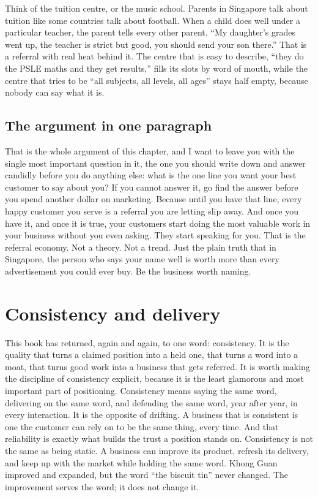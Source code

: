 \documentclass[10pt,twoside,openany]{memoir}
\newcommand{\needspacehead}{\needspace{4\baselineskip}}
\let\oldsection\section
\renewcommand{\section}{\needspacehead\oldsection}
\begin{document}
{Think of the tuition centre, or the music school. Parents in Singapore
talk about tuition like some countries talk about football. When a child
does well under a particular teacher, the parent tells every other
parent. ``My daughter's grades went up, the teacher is strict but good,
you should send your son there.'' That is a referral with real heat
behind it. The centre that is easy to describe, ``they do the PSLE maths
and they get results,'' fills its slots by word of mouth, while the
centre that tries to be ``all subjects, all levels, all ages'' stays
half empty, because nobody can say what it is.

\section{The argument in one
paragraph}\label{the-argument-in-one-paragraph}

That is the whole argument of this chapter, and I want to leave you with
the single most important question in it, the one you should write down
and answer candidly before you do anything else: what is the one line
you want your best customer to say about you? If you cannot answer it,
go find the answer before you spend another dollar on marketing. Because
until you have that line, every happy customer you serve is a referral
you are letting slip away. And once you have it, and once it is true,
your customers start doing the most valuable work in your business
without you even asking. They start speaking for you. That is the
referral economy. Not a theory. Not a trend. Just the plain truth that
in Singapore, the person who says your name well is worth more than
every advertisement you could ever buy. Be the business worth naming.

\FloatBarrier
\chapter{Consistency and delivery}\label{consistency-and-delivery}

This book has returned, again and again, to one word: consistency. It is
the quality that turns a claimed position into a held one, that turns a
word into a moat, that turns good work into a business that gets
referred. It is worth making the discipline of consistency explicit,
because it is the least glamorous and most important part of
positioning. Consistency means saying the same word, delivering on the
same word, and defending the same word, year after year, in every
interaction. It is the opposite of drifting. A business that is
consistent is one the customer can rely on to be the same thing, every
time. And that reliability is exactly what builds the trust a position
stands on. Consistency is not the same as being static. A business can
improve its product, refresh its delivery, and keep up with the market
while holding the same word. Khong Guan improved and expanded, but the
word ``the biscuit tin'' never changed. The improvement serves the word;
it does not change it.

}
\end{document}
